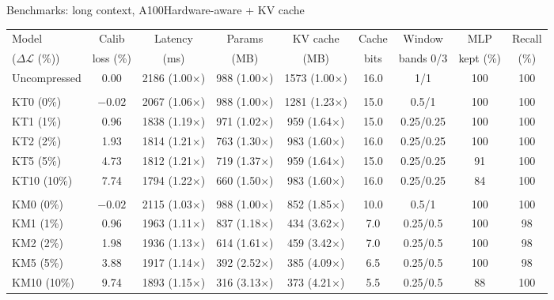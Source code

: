 \documentclass[aspectratio=169,10pt]{beamer}
\newcommand{\dloss}{\Delta\mathcal{L}}
\begin{document}
\begin{frame}{Benchmarks: long context, A100}{Hardware-aware + KV cache}
\begin{table}
\centering
\begin{adjustbox}{width=\linewidth, totalheight=0.64\textheight, keepaspectratio, center}
\centering
\scriptsize
\setlength{\tabcolsep}{3pt}
\begin{tabular}{lcccccccc}
\toprule
Model & Calib & Latency & Params & KV cache & Cache & Window & MLP & Recall \\
($\dloss$ (\%)) & loss (\%) & (ms) & (MB) & (MB) & bits & bands 0/3 & kept (\%) & (\%) \\
\midrule
Uncompressed & 0.00 & 2186 (1.00$\times$) & 988 (1.00$\times$) & 1573 (1.00$\times$) & 16.0 & 1/1 & 100 & 100 \\
\addlinespace
\multicolumn{9}{l}{\emph{Fastest within the level}} \\
KT0 (0\%) & $-0.02$ & 2067 (1.06$\times$) & 988 (1.00$\times$) & 1281 (1.23$\times$) & 15.0 & 0.5/1 & 100 & 100 \\
KT1 (1\%) & 0.96 & 1838 (1.19$\times$) & 971 (1.02$\times$) & 959 (1.64$\times$) & 15.0 & 0.25/0.25 & 100 & 100 \\
KT2 (2\%) & 1.93 & 1814 (1.21$\times$) & 763 (1.30$\times$) & 983 (1.60$\times$) & 16.0 & 0.25/0.25 & 100 & 100 \\
KT5 (5\%) & 4.73 & 1812 (1.21$\times$) & 719 (1.37$\times$) & 959 (1.64$\times$) & 15.0 & 0.25/0.25 & 91 & 100 \\
KT10 (10\%) & 7.74 & 1794 (1.22$\times$) & 660 (1.50$\times$) & 983 (1.60$\times$) & 16.0 & 0.25/0.25 & 84 & 100 \\
\addlinespace
\multicolumn{9}{l}{\emph{Least memory within the level}} \\
KM0 (0\%) & $-0.02$ & 2115 (1.03$\times$) & 988 (1.00$\times$) & 852 (1.85$\times$) & 10.0 & 0.5/1 & 100 & 100 \\
KM1 (1\%) & 0.96 & 1963 (1.11$\times$) & 837 (1.18$\times$) & 434 (3.62$\times$) & 7.0 & 0.25/0.5 & 100 & 98 \\
KM2 (2\%) & 1.98 & 1936 (1.13$\times$) & 614 (1.61$\times$) & 459 (3.42$\times$) & 7.0 & 0.25/0.5 & 100 & 98 \\
KM5 (5\%) & 3.88 & 1917 (1.14$\times$) & 392 (2.52$\times$) & 385 (4.09$\times$) & 6.5 & 0.25/0.5 & 100 & 98 \\
KM10 (10\%) & 9.74 & 1893 (1.15$\times$) & 316 (3.13$\times$) & 373 (4.21$\times$) & 5.5 & 0.25/0.5 & 88 & 100 \\

\end{tabular}
\end{adjustbox}
\end{table}
\end{frame}
\end{document}
